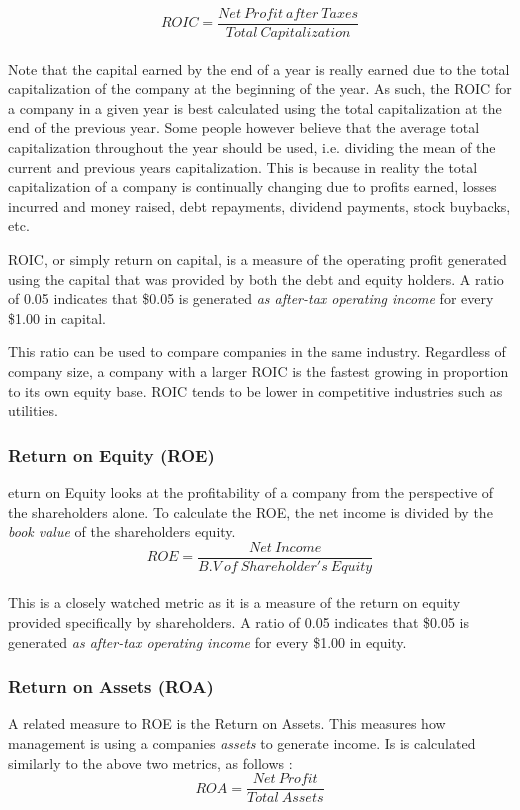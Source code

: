\documentclass{article}
\begin{document}
 \begin{equation}
    ROIC = \frac{Net\: Profit\: after\: Taxes}{Total\: Capitalization}
\end{equation}\\

Note that the capital earned by the end of a year is really earned due to the total capitalization of the company at the beginning of the year. As such, the ROIC for a company in a given year is best calculated using the total capitalization at the end of the previous year. Some people however believe that the average total capitalization throughout the year should be used, i.e. dividing the mean of the current and previous years capitalization. This is because in reality the total capitalization of a company is continually changing due to profits earned, losses incurred and money raised, debt repayments, dividend payments, stock buybacks, etc. 

ROIC, or simply return on capital, is a measure of the operating profit generated using the capital that was provided by both the debt and equity holders. A ratio of 0.05 indicates that \$0.05 is generated \textit{as after-tax operating income} for every \$1.00 in capital. 

This ratio can be used to compare companies in the same industry. Regardless of company size, a company with a larger ROIC is the fastest growing in proportion to its own equity base. ROIC tends to be lower in competitive industries such as utilities. 

\subsubsection{Return on Equity (ROE)}
eturn on Equity looks at the profitability of a company from the perspective of the shareholders alone. To calculate the ROE, the net income is divided by the \textit{book value} of the shareholders equity.
 \begin{equation}
    ROE = \frac{Net\: Income}{B.V\: of\: Shareholder's\: Equity}
\end{equation}\\
This is a closely watched metric as it is a measure of the return on equity provided specifically by shareholders. A ratio of 0.05 indicates that \$0.05 is generated \textit{as after-tax operating income} for every \$1.00 in equity. 

\subsubsection{Return on Assets (ROA)}
A related measure to ROE is the Return on Assets. This measures how management is using a companies \textit{assets} to generate income. Is is calculated similarly to the above two metrics, as follows :
 \begin{equation}
    ROA = \frac{Net\: Profit}{Total\: Assets}
\end{equation}\\
\end{document}
